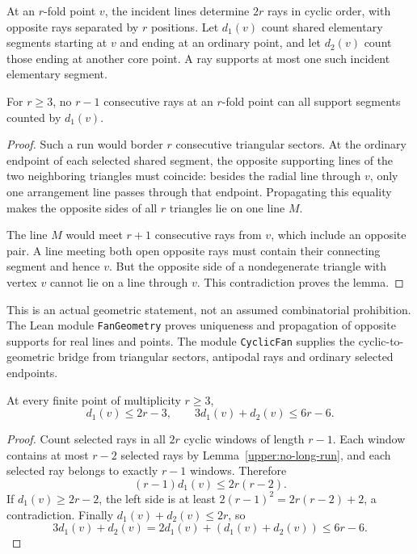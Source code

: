 At an $r$-fold point $v$, the incident lines determine $2r$ rays in cyclic order, with opposite rays separated by $r$ positions. Let $d_1(v)$ count shared elementary segments starting at $v$ and ending at an ordinary point, and let $d_2(v)$ count those ending at another core point. A ray supports at most one such incident elementary segment.

\begin{lemma}
\label{upper:no-long-run}
For $r\ge3$, no $r-1$ consecutive rays at an $r$-fold point can all support segments counted by $d_1(v)$.
\end{lemma}

\begin{proof}
Such a run would border $r$ consecutive triangular sectors. At the ordinary endpoint of each selected shared segment, the opposite supporting lines of the two neighboring triangles must coincide: besides the radial line through $v$, only one arrangement line passes through that endpoint. Propagating this equality makes the opposite sides of all $r$ triangles lie on one line $M$.

The line $M$ would meet $r+1$ consecutive rays from $v$, which include an opposite pair. A line meeting both open opposite rays must contain their connecting segment and hence $v$. But the opposite side of a nondegenerate triangle with vertex $v$ cannot lie on a line through $v$. This contradiction proves the lemma.
\end{proof}

This is an actual geometric statement, not an assumed combinatorial prohibition. The Lean module \texttt{FanGeometry} proves uniqueness and propagation of opposite supports for real lines and points. The module \texttt{CyclicFan} supplies the cyclic-to-geometric bridge from triangular sectors, antipodal rays and ordinary selected endpoints.

\begin{proposition}
\label{upper:fan-budget}
At every finite point of multiplicity $r\ge3$,
\begin{equation}
 d_1(v)\le2r-3,\qquad 3d_1(v)+d_2(v)\le6r-6.
 \label{upper:local-fan-budget}
\end{equation}
\end{proposition}

\begin{proof}
Count selected rays in all $2r$ cyclic windows of length $r-1$. Each window contains at most $r-2$ selected rays by Lemma~\ref{upper:no-long-run}, and each selected ray belongs to exactly $r-1$ windows. Therefore
\[
 (r-1)d_1(v)\le2r(r-2).
\]
If $d_1(v)\ge2r-2$, the left side is at least $2(r-1)^2=2r(r-2)+2$, a contradiction. Finally $d_1(v)+d_2(v)\le2r$, so
\[
 3d_1(v)+d_2(v)=2d_1(v)+(d_1(v)+d_2(v))\le6r-6.
\]
\end{proof}

